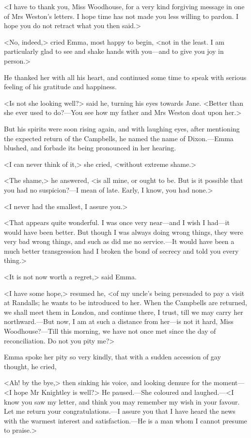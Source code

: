 <I have to thank you, Miss Woodhouse, for a very kind forgiving message in one of Mrs Weston's letters. I hope time has not made you less willing to pardon. I hope you do not retract what you then said.>

<No, indeed,> cried Emma, most happy to begin, <not in the least. I am particularly glad to see and shake hands with you—and to give you joy in person.>

He thanked her with all his heart, and continued some time to speak with serious feeling of his gratitude and happiness.

<Is not she looking well?> said he, turning his eyes towards Jane. <Better than she ever used to do?—You see how my father and Mrs Weston doat upon her.>

But his spirits were soon rising again, and with laughing eyes, after mentioning the expected return of the Campbells, he named the name of Dixon.—Emma blushed, and forbade its being pronounced in her hearing.

<I can never think of it,> she cried, <without extreme shame.>

<The shame,> he answered, <is all mine, or ought to be. But is it possible that you had no suspicion?—I mean of late. Early, I know, you had none.>

<I never had the smallest, I assure you.>

<That appears quite wonderful. I was once very near—and I wish I had—it would have been better. But though I was always doing wrong things, they were very bad wrong things, and such as did me no service.—It would have been a much better transgression had I broken the bond of secrecy and told you every thing.>

<It is not now worth a regret,> said Emma.

<I have some hope,> resumed he, <of my uncle's being persuaded to pay a visit at Randalls; he wants to be introduced to her. When the Campbells are returned, we shall meet them in London, and continue there, I trust, till we may carry her northward.—But now, I am at such a distance from her—is not it hard, Miss Woodhouse?—Till this morning, we have not once met since the day of reconciliation. Do not you pity me?>

Emma spoke her pity so very kindly, that with a sudden accession of gay thought, he cried,

<Ah! by the bye,> then sinking his voice, and looking demure for the moment—<I hope Mr Knightley is well?> He paused.—She coloured and laughed.\allowbreak—<I know you saw my letter, and think you may remember my wish in your favour. Let me return your congratulations.—I assure you that I have heard the news with the warmest interest and satisfaction.—He is a man whom I cannot presume to praise.>

